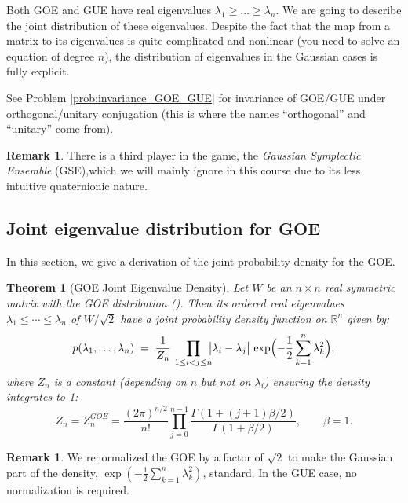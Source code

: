 \documentclass[letterpaper,11pt,oneside,reqno]{article}
\numberwithin{equation}{section}
\newtheorem{theorem}[proposition]{Theorem}
\theoremstyle{definition}
\newtheorem{remark}[proposition]{Remark}
\begin{document}
Both GOE and GUE have real eigenvalues $\lambda_1 \ge \ldots \ge \lambda_n$.
We are going to describe the joint distribution of these eigenvalues.
Despite the fact that the map from a matrix to its eigenvalues
is quite complicated and nonlinear (you need to solve an equation of degree $n$),
the distribution of eigenvalues in the Gaussian cases is fully explicit.

See Problem \ref{prob:invariance_GOE_GUE}
for invariance of GOE/GUE under orthogonal/unitary conjugation
(this is where the names ``orthogonal'' and ``unitary'' come from).

\begin{remark}
	There is a third player in the game, the \emph{Gaussian
	Symplectic Ensemble} (GSE),which we will mainly ignore in
	this course
	due to its less intuitive quaternionic nature.
\end{remark}

\subsection{Joint eigenvalue distribution for GOE}
\label{sub:GOE-derivation}

In this section, we give a derivation of the joint probability density for the GOE.

\begin{theorem}[GOE Joint Eigenvalue Density]
\label{thm:GOE-joint-eigs-detailed}
Let \(W\) be an \(n\times n\) real symmetric matrix with
the GOE distribution ().
Then its ordered real eigenvalues \(\lambda_1 \le \cdots \le
\lambda_n\)
of $W/\sqrt 2$
have a joint probability density function
on $\mathbb{R}^n$
given by:
\[
  p(\lambda_1,\ldots,\lambda_n)
  \;=\;\frac{1}{Z_{n}}
  \,\prod_{1 \le i < j \le n}
  \!\!\bigl|\lambda_i - \lambda_j\bigr|\,
  \exp\Bigl(
    -\frac{1}{2}\sum_{k=1}^n \lambda_k^2
  \Bigr),
\]
where \(Z_{n}\) is a constant (depending on \(n\) but not on \(\lambda_i\)) ensuring the density integrates to 1:
\begin{equation*}
	Z_n=Z_n^{GOE}=\frac{(2\pi)^{n/2}}{n!}
	\prod_{j=0}^{n-1}\frac{\Gamma(1+(j+1)\beta/2)}{\Gamma(1+\beta/2)}, \qquad
	\beta=1.
\end{equation*}
\end{theorem}
\begin{remark}
	We renormalized the GOE by a factor of $\sqrt 2$ to make the
	Gaussian part of the density, $\exp(-\frac{1}{2}\sum_{k=1}^n \lambda_k^2)$,
	standard. In the GUE case, no normalization is required.
\end{remark}
\end{document}
